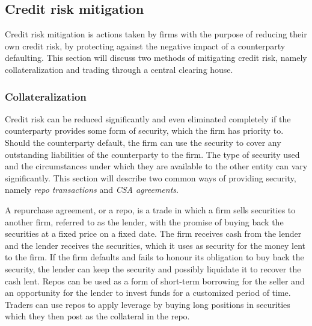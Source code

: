 \documentclass[main.tex]{subfiles}
\begin{document}
    \subsection{Credit risk mitigation}
    
    Credit risk mitigation is actions taken by firms with the purpose of reducing their own credit risk,
    by protecting against the negative impact of a counterparty defaulting.
    This section will discuss two methods of mitigating credit risk,
    namely collateralization and trading through a central clearing house.

    \subsubsection{Collateralization}
        Credit risk can be reduced significantly and even eliminated completely
        if the counterparty provides some form of security, which the firm has priority to.
        Should the counterparty default, the firm can use the security to cover any
        outstanding liabilities of the counterparty to the firm. 
        The type of security used and the circumstances 
        under which they are available to the other entity can vary significantly.
        This section will describe two common ways of providing security, 
        namely \textit{repo transactions} and \textit{CSA agreements}.

        A repurchase agreement, or a repo, is a trade in which a firm sells securities to another firm, 
        referred to as the lender, 
        with the promise of buying back the securities at a fixed price on a fixed date.
        The firm receives cash from the lender and the lender receives the securities,
        which it uses as security for the money lent to the firm. 
        If the firm defaults and fails to honour its obligation to buy back the security,
        the lender can keep the security and possibly liquidate it to recover the cash lent. 
        Repos can be used as a form of short-term borrowing for the seller
        and an opportunity for the lender to invest funds for a customized period of time. 
        Traders can use repos to apply leverage by buying long positions in securities 
        which they then post as the collateral in the repo. 
\end{document}
